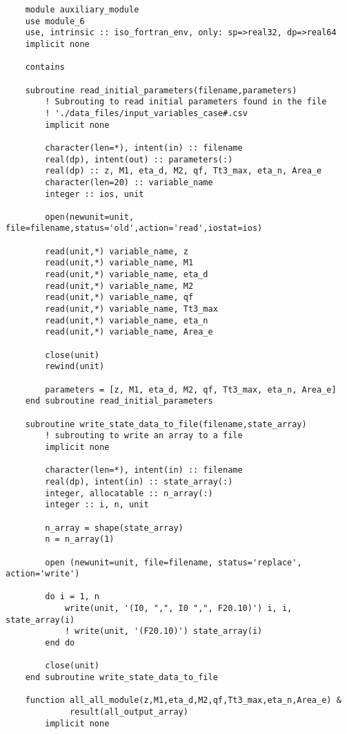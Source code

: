 \begin{verbatim}
    module auxiliary_module
    use module_6
    use, intrinsic :: iso_fortran_env, only: sp=>real32, dp=>real64
    implicit none

    contains

    subroutine read_initial_parameters(filename,parameters)
        ! Subrouting to read initial parameters found in the file
        ! './data_files/input_variables_case#.csv
        implicit none
    
        character(len=*), intent(in) :: filename
        real(dp), intent(out) :: parameters(:)
        real(dp) :: z, M1, eta_d, M2, qf, Tt3_max, eta_n, Area_e
        character(len=20) :: variable_name
        integer :: ios, unit
    
        open(newunit=unit, file=filename,status='old',action='read',iostat=ios)
    
        read(unit,*) variable_name, z
        read(unit,*) variable_name, M1
        read(unit,*) variable_name, eta_d
        read(unit,*) variable_name, M2
        read(unit,*) variable_name, qf
        read(unit,*) variable_name, Tt3_max
        read(unit,*) variable_name, eta_n
        read(unit,*) variable_name, Area_e

        close(unit)
        rewind(unit)
    
        parameters = [z, M1, eta_d, M2, qf, Tt3_max, eta_n, Area_e]
    end subroutine read_initial_parameters

    subroutine write_state_data_to_file(filename,state_array)
        ! subrouting to write an array to a file
        implicit none

        character(len=*), intent(in) :: filename
        real(dp), intent(in) :: state_array(:)
        integer, allocatable :: n_array(:)
        integer :: i, n, unit

        n_array = shape(state_array)
        n = n_array(1)

        open (newunit=unit, file=filename, status='replace', action='write')

        do i = 1, n
            write(unit, '(I0, ",", I0 ",", F20.10)') i, i, state_array(i)
            ! write(unit, '(F20.10)') state_array(i)
        end do

        close(unit)
    end subroutine write_state_data_to_file

    function all_all_module(z,M1,eta_d,M2,qf,Tt3_max,eta_n,Area_e) &
             result(all_output_array)
        implicit none


\end{verbatim}
